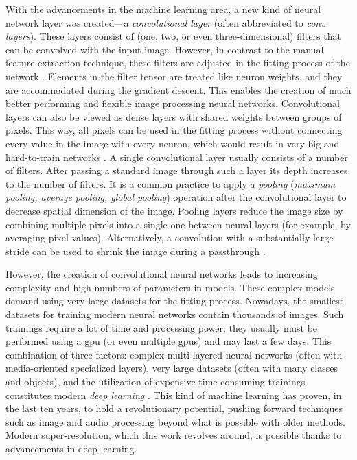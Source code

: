 With the advancements in the machine learning area, a new kind of neural network layer was created---a \textit{convolutional layer} (often abbreviated to \textit{conv layers}).
These layers consist of (one, two, or even three-dimensional) filters that can be convolved with the input image.
However, in  contrast to the manual feature extraction technique, these filters are adjusted in the fitting process of the network \cite{geron-2019-ml} .
Elements in the filter tensor are treated like neuron weights, and they are accommodated during the gradient descent.
This enables the creation of much better performing and flexible image processing neural networks.
Convolutional layers can also be viewed as dense layers with shared weights between groups of pixels.
This way, all pixels can be used in the fitting process without connecting every value in the image with every neuron, which would result in very big and hard-to-train networks \cite[Chapter~9]{goodfellow-2016-deeplearning}.
A single convolutional layer usually consists of a number of filters.
After passing a standard image through such a layer its depth increases to the number of filters.
It is a common practice to apply a \textit{pooling} (\textit{maximum pooling, average pooling, global pooling}) operation after the convolutional layer to decrease spatial dimension of the image.
Pooling layers reduce the image size by combining multiple pixels into a single one between neural layers (for example, by averaging pixel values).
Alternatively, a convolution with a substantially large stride can be used to shrink the image during a passthrough \cite{springenberg-2015-pooling}.

However, the creation of convolutional neural networks leads to increasing complexity and high numbers of parameters in models.
These complex models demand using very large datasets for the fitting process.
Nowadays, the smallest datasets for training modern neural networks contain thousands of images.
Such trainings require a lot of time and processing power; they usually must be performed using a \gls{gpu} (or even multiple \gls{gpu}s) and may last a few days.
This combination of three factors: complex multi-layered neural networks (often with media-oriented specialized layers), very large datasets (often with many classes and objects), and the utilization of expensive time-consuming trainings constitutes modern \textit{deep learning} \cite{lecun-2015-deeplearning}.
This kind of machine learning has proven, in the last ten years, to hold a revolutionary potential, pushing forward techniques such as image and audio processing beyond what is possible with older methods.
Modern super-resolution, which this work revolves around, is possible thanks to advancements in deep learning.

